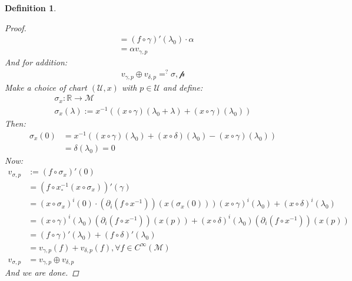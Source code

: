 \documentclass[10pt, oneside]{article}
\newcommand{\R}{\mathbb{R}}
\newcommand{\M}{\mathcal{M}}
\newtheorem{defn}{Definition}
\begin{document}
\begin{defn}
\begin{proof}
\begin{align*}
               &= (f \circ \gamma)' (\lambda_0) \cdot \alpha \\
               &= \alpha v_{\gamma,p} 
            \end{align*}
            And for addition:
            \begin{align*}
               v_{\gamma,p} \oplus v_{\delta,p} =^? \mathcal{\sigma,p}
            \end{align*}
            Make a choice of chart $(\mathcal{U},x)$ with $p \in \mathcal{U}$ and define:
            \begin{align*}
               \sigma_x: \R \to \M \\
               \sigma_x(\lambda) := x^{-1} ((x \circ \gamma)(\lambda_0 + \lambda)+ (x \circ \gamma)(\lambda_0))
            \end{align*}
            Then: 
            \begin{align*}
               \sigma_x (0) &= x^{-1} ((x \circ \gamma)(\lambda_0)+(x \circ \delta)(\lambda_0)-(x \circ \gamma)(\lambda_0)) \\
               &= \delta(\lambda_0) = 0   
            \end{align*}
            Now:
            \begin{align*}
               v_{\sigma ,p} &:= (f \circ \sigma_x)' (0) \\
               &= (f \circ x^{-1}_\circ(x \circ \sigma_x))'(\gamma) \\
               &= (x \circ \sigma_x)^i(0) \cdot (\partial_i (f \circ x^{-1}))(x(\sigma_x(0))) (x \circ \gamma)^i (\lambda_0) + (x \circ \delta)^i (\lambda_0)\\
               &= (x \circ \gamma)^i(\lambda_0)(\partial_i(f \circ x^{-1}))(x(p)) + (x \circ \delta)^i(\lambda_0)(\partial_i(f \circ x^{-1}))(x(p)) \\
               &= (f \circ \gamma)'(\lambda_0) + (f \circ \delta)' (\lambda_0) \\
               &= v_{\gamma,p}(f) + v_{\delta,p}(f), \forall f \in C^\infty (\M) \\
               v_{\sigma,p} &= v_{\gamma,p} \oplus v_{\delta,p}
            \end{align*}
            And we are done. 
         \end{proof}
      \end{defn}
\end{document}
